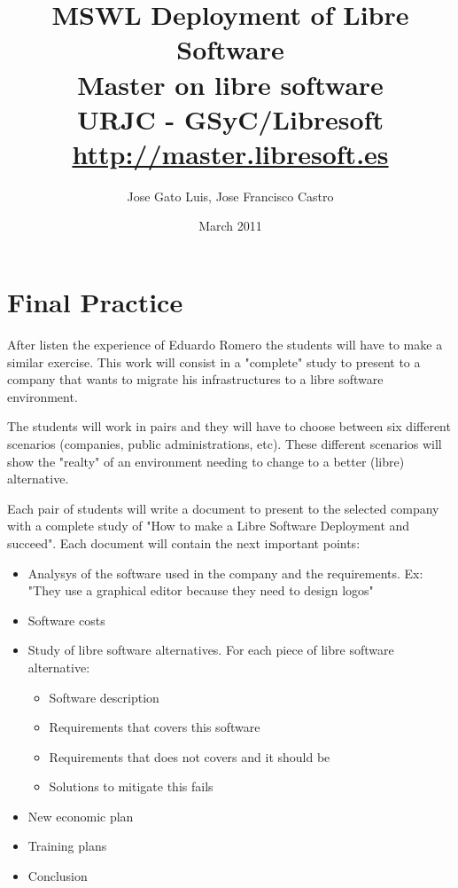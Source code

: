 \documentclass[a4paper]{article}
\title{MSWL Deployment of Libre Software \\
Master on libre software \\
URJC - GSyC/Libresoft \\
\url{http://master.libresoft.es}}
\author{Jose Gato Luis, Jose Francisco Castro}
\date{March 2011}
\begin{document}
\maketitle



\section { Final Practice}

After listen the experience of Eduardo Romero the students will have to make a similar exercise. This work will consist in a "complete" study to present to a company that wants to migrate his infrastructures to a libre software environment. 

The students will work in pairs and they will have to choose between six different scenarios (companies, public administrations, etc). These different scenarios will show the "realty" of an environment needing to change to a better (libre) alternative. 

Each pair of students will write a document to present to the selected company with a complete study of "How to make a Libre Software Deployment and succeed". Each document will contain the next important points:

\begin{itemize}
\item Analysys of the software used in the company and the requirements. Ex: "They use a graphical editor because they need to design logos"
\item Software costs
\item Study of libre software alternatives. For each piece of libre software alternative:
	\begin{itemize}
	\item Software description
	\item Requirements that covers this software
	\item Requirements that does not covers and it should be
	\item Solutions to mitigate this fails
	\end{itemize}
\item New economic plan
\item Training plans 
\item Conclusion

\end{itemize}


\end{document}
